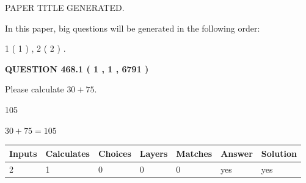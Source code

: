 \documentclass[12pt]{article}
\begin{document}
   
\vspace{0.2in}
   
   
   
   
   
   
   
   
 \vspace{0.2in}
 
 
 
 
   
   
 PAPER TITLE GENERATED.
   
   
   
\vspace{0.2in}
   
In this paper, big questions will be generated in the following order: 
   
   
   1 ( 1 )
 ,
   2 ( 2 )
 .
  
\vspace{0.2in}
  
{\textbf{\Large{QUESTION
468.1 
 ( 1 , 1 , 6791 )
}}}
  
  
 
Please calculate $ %
30 +  %
75 $.
 
 
 
\noindent{}
 
 

105
 
 
\noindent{}
 
 

 
 
 
\noindent{}
 
 

$ %
30 +  %
75=   %
105$
 
 
\noindent{}
 
 

 
   
   
   
   
\noindent\begin{tabular}{|l|l|l|l|l|l|l|}
 \hline
Inputs & Calculates & Choices & Layers & Matches & Answer & Solution \\ \hline
 2  & 
 1  & 
 0
  & 
 0  & 
 0  & 
  yes & 
  yes 
  \\ \hline
 \end{tabular}
   
\end{document}
